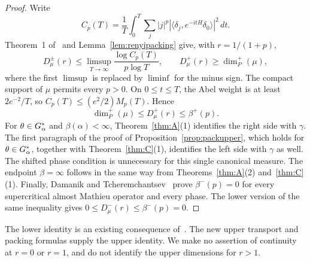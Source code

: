 \begin{proof}
Write
\[
C_p(T)=\frac1T\int_0^T\sum_j|j|^p
|\langle\delta_j,e^{-itH}\delta_0\rangle|^2\,dt.
\]
Theorem~1 of~\cite{BGT2000} and Lemma~\ref{lem:renyipacking} give, with $r=1/(1+p)$,
\[
D_\mu^\pm(r)\le
\limsup_{T\to\infty}\frac{\log C_p(T)}{p\log T},
\qquad
D_\mu^+(r)\ge\dim_P^+(\mu),
\]
where the first $\limsup$ is replaced by $\liminf$ for the minus sign.
The compact support of $\mu$ permits every $p>0$.
On $0\le t\le T$, the Abel weight is at least $2e^{-2}/T$, so
$C_p(T)\le(e^2/2)M_p(T)$. Hence
\[
\dim_P^+(\mu)\le D_\mu^+(r)\le\beta^+(p).
\]
For $\theta\in G_\alpha^*$ and $\beta(\alpha)<\infty$, Theorem~\ref{thm:A}(1) identifies the right side with $\gamma$. The first paragraph of the proof of Proposition~\ref{prop:packupper}, which holds for $\theta\in G_\alpha^*$, together with Theorem~\ref{thm:C}(1), identifies the left side with $\gamma$ as well. The shifted phase condition is unnecessary for this single canonical measure. The endpoint $\beta=\infty$ follows in the same way from Theorems~\ref{thm:A}(2) and~\ref{thm:C}(1).
Finally, Damanik and Tcheremchantsev~\cite[Theorem~4]{DT2007} prove $\beta^-(p)=0$ for every supercritical almost Mathieu operator and every phase. The lower version of the same inequality gives
$0\le D_\mu^-(r)\le\beta^-(p)=0$.
\end{proof}

The lower identity is an existing consequence of~\cite{DT2007,BGT2000}. The new upper transport and packing formulas supply the upper identity. We make no assertion of continuity at $r=0$ or $r=1$, and do not identify the upper dimensions for $r>1$.


